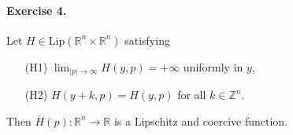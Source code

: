\documentclass[12pt, oneside]{amsart}  	%
\begin{document}
\paragraph{\textbf{Exercise 4.}} Let $H\in \text{Lip}(\mathbb{R}^n\times \mathbb{R}^n)$ satisfying \vspace*{0.15cm}
\begin{itemize}
\item[(H1)] $\displaystyle \lim_{|p|\longrightarrow\infty} H(y,p) = +\infty$ uniformly in $y$,\vspace*{0.15cm}
\item[(H2)] $H(y+k,p) = H(y,p)$ for all $k\in \mathbb{Z}^n$\vspace*{0.15cm}.
\end{itemize}
Then $\overline{H}(p):\mathbb{R}^n\longrightarrow \mathbb{R}$ is a Lipschitz and coercive function.
\end{document}
